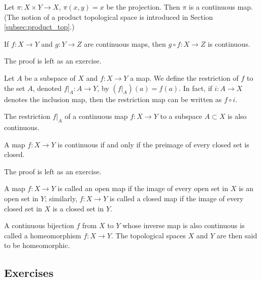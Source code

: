 \begin{example} Let $\pi: X\times Y\to X$,
	$\pi(x,y) = x$ be the projection. Then $\pi$ is a continuous map. (The
	notion of a product topological space is introduced in Section
	\ref{subsec:product_top}.)

\end{example}

\begin{proposition}
	If $f:X\to Y$ and $g:Y\to Z$ are continuous maps, then $g\circ f: X\to
		Z$ is continuous.
\end{proposition}

The proof is left as an exercise.


Let $A$ be a subspace of $X$ and $f:X\to Y$ a map. We define the restriction
of $f$ to the set $A$, denoted $f|_A:A\to Y$, by $(f|_A)(a) = f(a)$. In fact,
if $i:A\to X$ denotes the inclusion map, then the restriction map can be
written as $f\circ i$.


\begin{corollary}
	The restriction $f|_A$ of a continuous map $f:X\to Y$ to a subspace
	$A\subset X$ is also continuous.
\end{corollary}


\begin{proposition}
	A map $f:X\to Y$ is continuous if and only if the preimage of every
	closed set is closed.

\end{proposition}

The proof is left as an exercise.


\begin{definition}
	A map $f:X\to Y$ is called an open map if the image of every open set in
	$X$ is an open set in $Y$; similarly, $f:X\to Y$ is called a closed map
	if the image of every closed set in $X$ is a closed set in $Y$.
\end{definition}


\begin{definition}[Homeomorphism] A continuous bijection $f$ from $X$ to $Y$
	whose inverse map is also continuous is called a homeomorphism
	$f:X\to Y$. The topological spaces $X$ and $Y$ are then said to be
	homeomorphic.

\end{definition}



\subsection{Exercises} \label{exsec:top}

